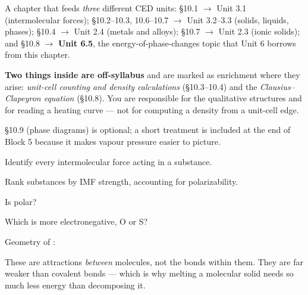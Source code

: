 \documentclass{apchem-notes}
\begin{document}
\apctitleblock

\begin{apcnote}
A chapter that feeds \emph{three} different CED units:
\S10.1 $\to$ Unit 3.1 (intermolecular forces);
\S10.2--10.3, 10.6--10.7 $\to$ Unit 3.2--3.3 (solids, liquids, phases);
\S10.4 $\to$ Unit 2.4 (metals and alloys);
\S10.7 $\to$ Unit 2.3 (ionic solids);
and \S10.8 $\to$ \textbf{Unit 6.5}, the energy-of-phase-changes topic that
Unit 6 borrows from this chapter.

\textbf{Two things inside are off-syllabus} and are marked as enrichment
where they arise: \emph{unit-cell counting and density calculations}
(\S10.3--10.4) and the \emph{Clausius--Clapeyron equation} (\S10.8). You are
responsible for the qualitative structures and for reading a heating curve
--- not for computing a density from a unit-cell edge.

\S10.9 (phase diagrams) is optional; a short treatment is included at the
end of Block 5 because it makes vapour pressure easier to picture.
\end{apcnote}


\begin{objectives}
  \item Identify every intermolecular force acting in a substance.
  \item Rank substances by IMF strength, accounting for polarizability.
\end{objectives}


\begin{warmup}[3]
  \item Is  polar? 
  \item Which is more electronegative, O or S?
  \item Geometry of : 
\end{warmup}



These are attractions \emph{between} molecules, not the bonds within them.
They are far weaker than covalent bonds --- which is why melting a molecular
solid needs so much less energy than decomposing it.
\end{document}
